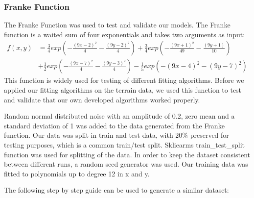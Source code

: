 \subsubsection{Franke Function}

The Franke Function was used to test and validate our models.
The Franke function is a waited sum of four exponentials and takes two
arguments as input: 
\begin{align}
    \label{eq:franke_function} 
    f(x,y) &= \frac{3}{4}exp\left(-\frac{(9x-2)^2}{4}-\frac{(9y-2)^2}{4} \right)
    + \frac{3}{4}exp\left(-\frac{(9x+1)^2}{49}-\frac{(9y+1)}{10} \right) \\
           &+ \frac{1}{2}exp\left(-\frac{(9x-7)^2}{4}-\frac{(9y-3)^2}{4}
           \right)-\frac{1}{5}exp(-(9x-4)^2-(9y-7)^2)
\end{align}
This function is widely used for testing of different fitting algorithms. 
Before we applied our fitting algorithms on the terrain data, we used this function
to test and validate that our own developed algorithms worked properly.    

Random normal distributed noise with an amplitude of 0.2, zero mean and a
standard deviation of 1 was added to the data generated from the Franke
function. Our data was split in train and test data, with $20\%$ preserved for
testing purposes, which is a common train/test split. Skliearms train\_test\_split function was used for splitting
of the data. In order to keep the dataset consistent between different runs, a
random seed generator was used. Our training data was fitted to polynomials up
to degree 12 in x and y. 

The following step by step guide can be used to generate a similar dataset: 



